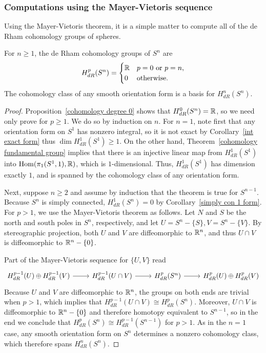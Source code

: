 \subsubsection{Computations using the Mayer-Vietoris sequence}
Using the Mayer-Vietoris theorem, it is a simple matter to compute all of the de Rham cohomology groups of spheres.
\begin{theorem}\label{cohomology S^n}
For $n\geq1$, the de Rham cohomology groups of $S^n$ are
\[H^p_{dR}(S^n)=\begin{cases}
\mathbb{R}&\text{$p=0$ or $p=n$},\\
0&\text{otherwise}.
\end{cases}\]
The cohomology class of any smooth orientation form is a basis for $H^n_{dR}(S^n)$.
\end{theorem}
\begin{proof}
Proposition~\ref{cohomology degree 0} shows that $H^0_{dR}(S^n)=\mathbb{R}$, so we need only prove for $p\geq1$. We do so by induction on $n$. For $n=1$, note first that any orientation form on $S^1$ has nonzero integral, so it is not exact by Corollary~\ref{int exact form} thus $\dim H^1_{dR}(S^1)\geq 1$. On the other hand, Theorem~\ref{cohomology fundamental group} implies that there is an injective linear map from $H^1_{dR}(S^1)$ into $\mathrm{Hom}(\pi_1(S^1,1),\mathbb{R})$, which is $1$-dimensional. Thus, $H^1_{dR}(S^1)$ has dimension exactly $1$, and is spanned by the cohomology class of any orientation form.\par
Next, suppose $n\geq 2$ and assume by induction that the theorem is true for $S^{n-1}$. Because $S^n$ is simply connected, $H^1_{dR}(S^n)=0$ by Corollary~\ref{simply con 1 form}. For $p>1$, we use the Mayer-Vietoris theorem as follows. Let $N$ and $S$ be the north and south poles in $S^n$, respectively, and let $U=S^n-\{S\},V=S^n-\{V\}$. By stereographic projection, both $U$ and $V$ are diffeomorphic to $\mathbb{R}^n$, and thus $U\cap V$ is diffeomorphic to $\mathbb{R}^n-\{0\}$.\par
Part of the Mayer-Vietoris sequence for $\{U,V\}$ read
\[\begin{tikzcd}
H^{p-1}_{dR}(U)\oplus H^{p-1}_{dR}(V)\ar[r]&H^{p-1}_{dR}(U\cap V)\ar[r]&H^{p}_{dR}(S^n)\ar[r]&H^p_{dR}(U)\oplus H^p_{dR}(V)
\end{tikzcd}\]
Because $U$ and $V$ are diffeomorphic to $\mathbb{R}^n$, the groups on both ends are trivial
when $p>1$, which implies that $H^{p-1}_{dR}(U\cap V)\cong H^p_{dR}(S^n)$. Moreover, $U\cap V$ is diffeomorphic to $\mathbb{R}^n-\{0\}$ and therefore homotopy equivalent to $S^{n-1}$, so in the end we conclude that $H^p_{dR}(S^n)\cong H^{p-1}_{dR}(S^{n-1})$ for $p>1$. As in the $n=1$ case, any smooth orientation form on $S^n$ determines a nonzero cohomology class, which therefore spans $H^n_{dR}(S^n)$.
\end{proof}
